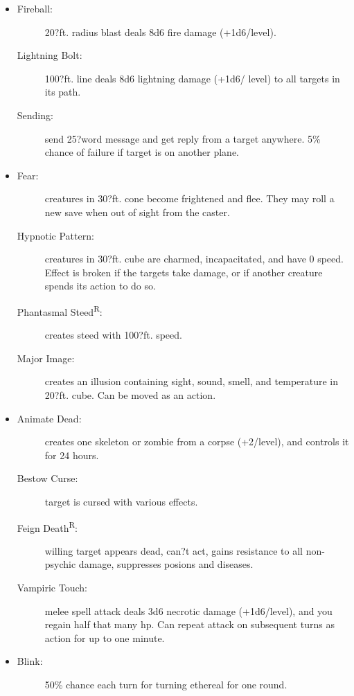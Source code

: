 \documentclass[DIV=14, paper=a4, fontsize=10pt, twocolumn, twoside]{scrartcl}
\begin{document}
\begin{itemize}[align=parleft,labelwidth=1cm]
\begin{description}
\end{description}
\renewcommand{\labelitemi}{Evoc}\item
\begin{description}
 \item[Fireball:] 20?ft. radius blast deals 8d6 fire damage (+1d6/level).
 \item[Lightning Bolt:] 100?ft. line deals 8d6 lightning damage (+1d6/ level) to all targets in its path.
 \item[Sending:] send 25?word message and get reply from a target anywhere. 5\% chance of failure if target is on another plane.
\end{description}
\renewcommand{\labelitemi}{Illus}\item
\begin{description}
 \item[Fear:] creatures in 30?ft. cone become frightened and flee. They may roll a new save when out of sight from the caster.
 \item[Hypnotic Pattern:] creatures in 30?ft. cube are charmed, incapacitated, and have 0 speed. Effect is broken if the targets take damage, or if another creature spends its action to do so.
 \item[Phantasmal Steed\textsuperscript{R}:] creates steed with 100?ft. speed.
 \item[Major Image:] creates an illusion containing sight, sound, smell, and temperature in 20?ft. cube. Can be moved as an action.
\end{description}
\renewcommand{\labelitemi}{Necro}\item
\begin{description}
 \item[Animate Dead:] creates one skeleton or zombie from a corpse (+2/level), and controls it for 24 hours.
 \item[Bestow Curse:] target is cursed with various effects.
 \item[Feign Death\textsuperscript{R}:] willing target appears dead, can?t act, gains resistance to all non-psychic damage, suppresses posions and diseases.
 \item[Vampiric Touch:] melee spell attack deals 3d6 necrotic damage (+1d6/level), and you regain half that many hp. Can repeat attack on subsequent turns as action for up to one minute.
\end{description}
\renewcommand{\labelitemi}{Trans}\item
\begin{description}
 \item[Blink:] 50\% chance each turn for turning ethereal for one round.

\end{description}
\end{itemize}
\end{document}
